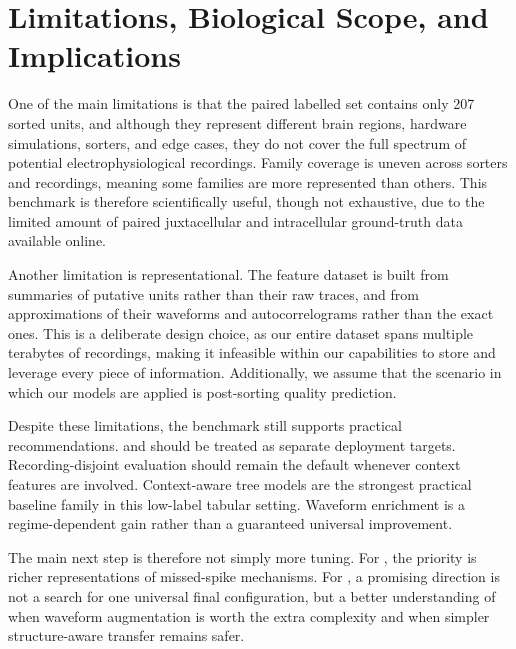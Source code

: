 \section{Limitations, Biological Scope, and Implications}

One of the main limitations is that the paired labelled set contains only 207 sorted units, and although they represent different brain regions, hardware simulations, sorters, and edge cases, they do not cover the full spectrum of potential electrophysiological recordings. Family coverage is uneven across sorters and recordings, meaning some families are more represented than others. This benchmark is therefore scientifically useful, though not exhaustive, due to the limited amount of paired juxtacellular and intracellular ground-truth data available online.

Another limitation is representational. The feature dataset is built from summaries of putative units rather than their raw traces, and from approximations of their waveforms and autocorrelograms rather than the exact ones. This is a deliberate design choice, as our entire dataset spans multiple terabytes of recordings, making it infeasible within our capabilities to store and leverage every piece of information. Additionally, we assume that the scenario in which our models are applied is post-sorting quality prediction.

Despite these limitations, the benchmark still supports practical recommendations. \fpos{} and \fmiss{} should be treated as separate deployment targets. Recording-disjoint evaluation should remain the default whenever context features are involved. Context-aware tree models are the strongest practical baseline family in this low-label tabular setting. Waveform enrichment is a regime-dependent gain rather than a guaranteed universal improvement.

The main next step is therefore not simply more tuning. For \fmiss{}, the priority is richer representations of missed-spike mechanisms. For \fpos{}, a promising direction is not a search for one universal final configuration, but a better understanding of when waveform augmentation is worth the extra complexity and when simpler structure-aware transfer remains safer.

